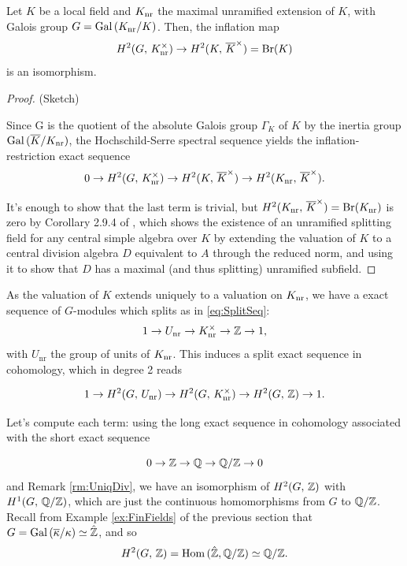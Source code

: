 \documentclass[a4paper, oneside]{memoir}
\begin{document}
\begin{proposition}
    Let $K$ be a local field and $K_{\text{nr}}$ the maximal unramified extension of $K$, with Galois group $G=\operatorname{Gal}{(K_{\text{nr}}/K)}$. Then, the inflation map
    \[
        H^{2}( G, \, K_{\text{nr}}^\times )\to H^{2}( K, \, \overline{K}^\times )= \mathrm{Br}(K)
    \]
    is an isomorphism.

\end{proposition}

\begin{proof}{(Sketch)}

    Since G is the quotient of the absolute Galois group $\Gamma_K$ of $K$ by the inertia group $\operatorname{Gal}{(\overline{K}/K_{\text{nr}})}$, the Hochschild-Serre spectral sequence yields the inflation-restriction exact sequence
    \[
        0\to H^{2}( G, \, K_{\text{nr}}^\times )\to H^{2}( K, \, \overline{K}^\times )\to H^{2}( K_{\text{nr}}, \, \overline{K}^\times ).
    \]

    It's enough to show that the last term is trivial, but $H^{2}( K_{\text{nr}}, \, \overline{K}^\times )=\mathrm{Br}(K_{\text{nr}})$ is zero by Corollary 2.9.4 of \cite{SzamuelyGille}, which shows the existence of an unramified splitting field for any central simple algebra over $K$ by extending the valuation of $K$ to a central division algebra $D$ equivalent to $A$ through the reduced norm, and using it to show that $D$ has a maximal (and thus splitting) unramified subfield.
\end{proof}

As the valuation of $K$ extends uniquely to a valuation on $K_{\text{nr}}$, we have a exact sequence of $G$-modules which splits as in \eqref{eq:SplitSeq}:
\[
    1\to U_{\text{nr}} \to K_{\text{nr}}^\times\to\mathbb{Z}\to 1,
\]
with $U_{\text{nr}}$ the group of units of $K_{\text{nr}}$. This induces a split exact sequence in cohomology, which in degree 2 reads

\begin{equation}\label{eq:BrSeq}
    1\to H^{2}( G, \, U_{\text{nr}} )\to H^{2}( G, \, K_{\text{nr}}^\times )\to H^{2}( G, \, \mathbb{Z} )\to 1.
\end{equation}

Let's compute each term: using the long exact sequence in cohomology associated with the short exact sequence

\[
    0\to\mathbb{Z}\to\mathbb{Q}\to\mathbb{Q}/\mathbb{Z}\to 0
\]
and Remark \ref{rm:UniqDiv}, we have an isomorphism of $H^{2}( G, \, \mathbb{Z} )$ with $H^{1}( G, \, \mathbb{Q}/\mathbb{Z} )$, which are just the continuous homomorphisms from $G$ to $\mathbb{Q}/\mathbb{Z}$. Recall from Example
\ref{ex:FinFields} of the previous
section that $G=\operatorname{Gal}{(\overline{\kappa}/\kappa)}\simeq\hat{\mathbb{Z}}$, and so
\[
    H^{2}( G, \, \mathbb{Z} )=\operatorname{Hom}{(\hat{\mathbb{Z}},\mathbb{Q}/\mathbb{Z})}\simeq\mathbb{Q}/\mathbb{Z}.
\]
\end{document}
